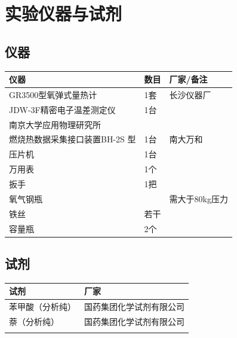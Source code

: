 \documentclass[11pt]{report}
\begin{document}
\chapter{实验仪器与试剂}
\label{sec:orgb174def}
\section{仪器}
\label{sec:org4e2faf4}
\begin{center}
\begin{tabular}{lll}
仪器 & 数目 & 厂家/备注\\
\hline
GR3500型氧弹式量热计 & 1套 & 长沙仪器厂\\
JDW-3F精密电子温差测定仪 & 1台 & \\
南京大学应用物理研究所 &  & \\
燃烧热数据采集接口装置BH-2S 型 & 1台 & 南大万和\\
压片机 & 1台 & \\
万用表 & 1个 & \\
扳手 & 1把 & \\
氧气钢瓶 &  & 需大于80kg压力\\
铁丝 & 若干 & \\
容量瓶 & 2个 & \\
\end{tabular}
\end{center}


\section{试剂}
\label{sec:org538d842}
\begin{center}
\begin{tabular}{ll}
试剂 & 厂家\\
\hline
苯甲酸（分析纯） & 国药集团化学试剂有限公司\\
萘（分析纯） & 国药集团化学试剂有限公司\\
 & \\
\end{tabular}
\end{center}
\end{document}
